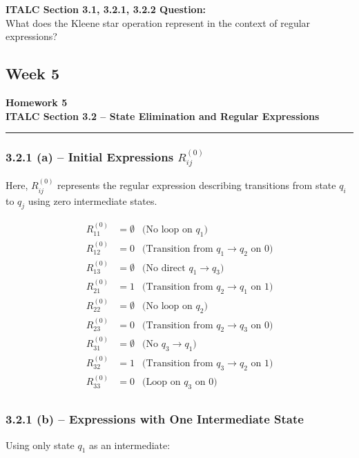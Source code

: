 \documentclass{article}
\theoremstyle{theorem}
\theoremstyle{definition}
\theoremstyle{remark}
\begin{document}
\textbf{ITALC Section 3.1, 3.2.1, 3.2.2 Question:}\\
What does the Kleene star operation represent in the context of regular expressions?


\subsection{Week 5}
\textbf{Homework 5} \\
\textbf{ITALC Section 3.2 – State Elimination and Regular Expressions} \\
\vspace{0.5em}
\hrule
\vspace{0.5em}
\subsubsection*{3.2.1 (a) – Initial Expressions \( R_{ij}^{(0)} \)}

Here, \( R_{ij}^{(0)} \) represents the regular expression describing transitions from state \( q_i \) to \( q_j \) using zero intermediate states.

\[
\begin{aligned}
R_{11}^{(0)} &= \emptyset &\text{(No loop on } q_1) \\
R_{12}^{(0)} &= 0         &\text{(Transition from } q_1 \to q_2 \text{ on 0)} \\
R_{13}^{(0)} &= \emptyset &\text{(No direct } q_1 \to q_3) \\
R_{21}^{(0)} &= 1         &\text{(Transition from } q_2 \to q_1 \text{ on 1)} \\
R_{22}^{(0)} &= \emptyset &\text{(No loop on } q_2) \\
R_{23}^{(0)} &= 0         &\text{(Transition from } q_2 \to q_3 \text{ on 0)} \\
R_{31}^{(0)} &= \emptyset &\text{(No } q_3 \to q_1) \\
R_{32}^{(0)} &= 1         &\text{(Transition from } q_3 \to q_2 \text{ on 1)} \\
R_{33}^{(0)} &= 0         &\text{(Loop on } q_3 \text{ on 0)} \\
\end{aligned}
\]

\subsubsection*{3.2.1 (b) – Expressions with One Intermediate State}

Using only state \( q_1 \) as an intermediate:
\end{document}
